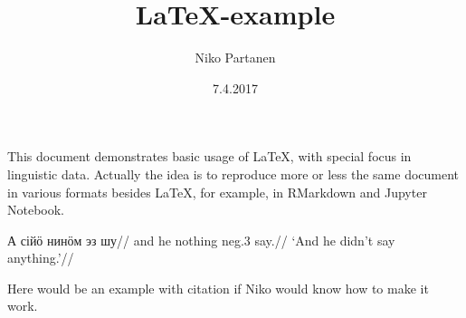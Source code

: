 \documentclass[a4paper, 12pt, english]{article}
\title{\LaTeX-example}
\author{Niko Partanen}
\date{7.4.2017}
\begin{document}
\maketitle 

This document demonstrates basic usage of \LaTeX, with special focus in linguistic data. Actually the idea is to reproduce more or less the same document in various formats besides LaTeX, for example, in RMarkdown and Jupyter Notebook.


\ex
\begingl
\gla А сійӧ нинӧм эз шу//
\glb and he nothing neg.3 say.//
\glft ‘And he didn't say anything.’//
\endgl
\xe 

Here would be an example with citation if Niko would know how to make it work.

   
 
\end{document}
